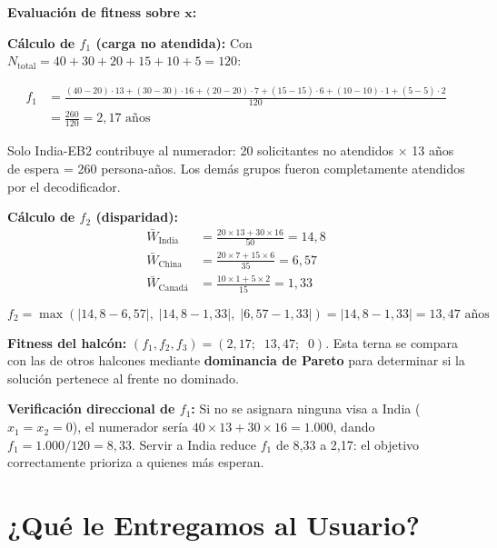 \documentclass[12pt,letterpaper]{article}
\begin{document}
\textbf{Evaluación de fitness sobre $\mathbf{x}$:}

\textbf{Cálculo de $f_1$ (carga no atendida):} Con $N_{\text{total}} = 40+30+20+15+10+5 = 120$:

\begin{align*}
f_1 &= \frac{(40\!-\!20){\cdot}13 + (30\!-\!30){\cdot}16 + (20\!-\!20){\cdot}7 + (15\!-\!15){\cdot}6 + (10\!-\!10){\cdot}1 + (5\!-\!5){\cdot}2}{120} \\
    &= \frac{260}{120} = 2{,}17 \text{ años}
\end{align*}

Solo India-EB2 contribuye al numerador: 20 solicitantes no atendidos $\times$ 13 años de espera = 260 persona-años. Los demás grupos fueron completamente atendidos por el decodificador.

\textbf{Cálculo de $f_2$ (disparidad):}
\begin{align*}
\bar{W}_{\text{India}} &= \tfrac{20 \times 13 + 30 \times 16}{50} = 14{,}8 \\
\bar{W}_{\text{China}} &= \tfrac{20 \times 7 + 15 \times 6}{35} = 6{,}57 \\
\bar{W}_{\text{Canadá}} &= \tfrac{10 \times 1 + 5 \times 2}{15} = 1{,}33
\end{align*}

$$f_2 = \max(|14{,}8 - 6{,}57|,\; |14{,}8 - 1{,}33|,\; |6{,}57 - 1{,}33|) = |14{,}8 - 1{,}33| = 13{,}47 \text{ años}$$

\begin{resultbox}
\textbf{Fitness del halcón:} $(f_1, f_2, f_3) = (2{,}17;\;\; 13{,}47;\;\; 0)$. Esta terna se compara con las de otros halcones mediante \textbf{dominancia de Pareto} para determinar si la solución pertenece al frente no dominado.

\vspace{0.3em}
\textbf{Verificación direccional de $f_1$:} Si no se asignara ninguna visa a India ($x_1 = x_2 = 0$), el numerador sería $40 \times 13 + 30 \times 16 = 1.000$, dando $f_1 = 1.000/120 = 8{,}33$. Servir a India reduce $f_1$ de 8,33 a 2,17: el objetivo correctamente prioriza a quienes más esperan. 
\end{resultbox}


\newpage
\section{¿Qué le Entregamos al Usuario?}
\label{sec:entregable}
\end{document}
